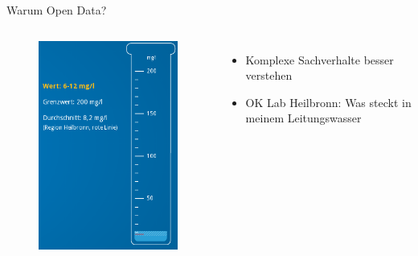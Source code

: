 \begin{frame}[t]{Warum Open Data?}
 \begin{columns}
  \begin{figure}[h]
   \centering
   \includegraphics[scale=0.3]{section_open_data_complexity.png}
  \end{figure}
  \begin{itemize}
   \item Komplexe Sachverhalte besser verstehen
   \item OK Lab Heilbronn: Was steckt in meinem Leitungswasser \cite{Heilbronn}
  \end{itemize}
 \end{columns}
\end{frame}

